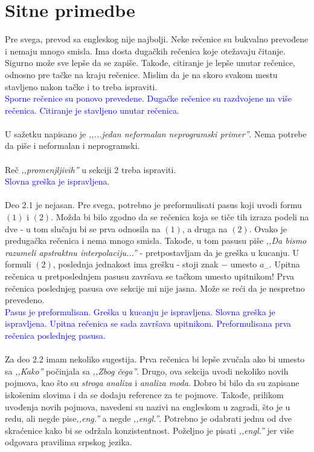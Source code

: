 \documentclass[a4paper]{report}
\newcommand{\odgovor}[1]{\textcolor{blue}{#1}}
\begin{document}
\section{Sitne primedbe}
Pre svega, prevod sa engleskog nije najbolji. Neke rečenice su bukvalno prevođene i nemaju mnogo smisla. Ima dosta dugačkih rečenica koje otežavaju čitanje. Sigurno može sve lepše da se zapiše. Takođe, citiranje je lepše unutar rečenice, odnosno pre tačke na kraju rečenice. Mislim da je na skoro svakom mestu stavljeno nakon tačke i to treba ispraviti.
\\
\odgovor{Sporne rečenice su ponovo prevedene. Dugačke rečenice su razdvojene na više rečenica. Citiranje je stavljeno unutar rečenica.}
\\
\\
U sažetku napisano je \textit{‚‚...jedan neformalan neprogramski primer''}. Nema potrebe da piše i neformalan i neprogramski.
\\
\\
Reč \textit{‚‚promenjljivih''} u sekciji 2 treba ispraviti.
\\
 \odgovor{Slovna greška je ispravljena.}
\\
\\
Deo 2.1 je nejasan. Pre svega, potrebno je preformulisati pasus koji uvodi formu $(1)$ i $(2)$. Možda bi bilo zgodno da se rečenica koja se tiče tih izraza podeli na dve - u tom slučaju bi se prva odnosila na $(1)$, a druga na $(2)$. Ovako je predugačka rečenica i nema mnogo smisla. Takođe, u tom pasusu piše \textit{‚‚Da bismo razumeli apstraktnu interpolaciju...''} - pretpostavljam da je greška u kucanju. U formuli $(2)$, poslednja jednakost ima grešku - stoji znak $-$ umesto $a_-$. Upitna rečenica u pretposlednjem pasusu završava se tačkom umesto upitnikom! Prva rečenica poslednjeg pasusa ove sekcije mi nije jasna. Može se reći da je nespretno prevedeno. 
\\
 \odgovor{Pasus je preformulisan. Greška u kucanju je ispravljena. Slovna greška je ispravljena. Upitna rečenica se sada završava upitnikom. Preformulisana prva rečenica poslednjeg pasusa.} 
\\
\\
Za deo 2.2 imam nekoliko sugestija. Prva rečenica bi lepše zvučala ako bi umesto sa \textit{‚‚Kako''} počinjala sa \textit{‚‚Zbog čega''}. Drugo, ova sekcija uvodi nekoliko novih pojmova, kao što su \textit{stroga analiza} i \textit{analiza moda}. Dobro bi bilo da su zapisane iskošenim slovima i da se dodaju reference za te pojmove. Takođe, prilikom uvođenja novih pojmova, navedeni su nazivi na engleskom u zagradi, što je u redu, ali negde pise\textit{‚‚eng.''} a negde \textit{‚‚engl.''}. Potrebno je odabrati jednu od dve skraćenice kako bi se održala konzistentnost. Poželjno je pisati \textit{‚‚engl.''} jer više odgovara pravilima srpskog jezika. 
\end{document}
